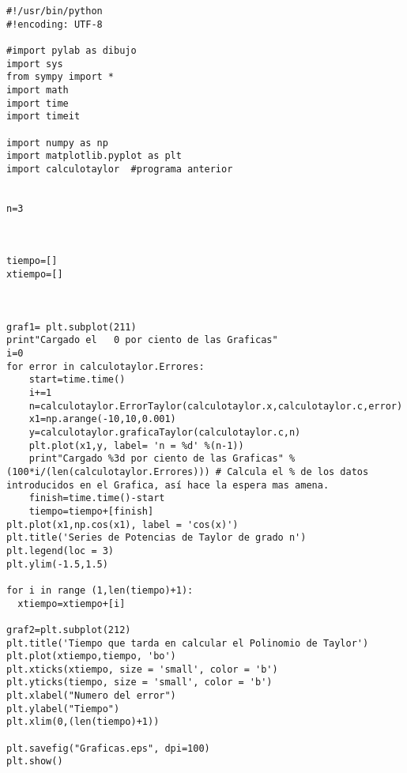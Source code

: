 \begin{center}
\begin{footnotesize}
\begin{verbatim}
#!/usr/bin/python
#!encoding: UTF-8

#import pylab as dibujo
import sys
from sympy import *
import math
import time
import timeit

import numpy as np 
import matplotlib.pyplot as plt
import calculotaylor  #programa anterior


n=3



tiempo=[]
xtiempo=[]



graf1= plt.subplot(211)
print"Cargado el   0 por ciento de las Graficas"
i=0
for error in calculotaylor.Errores:
    start=time.time()
    i+=1
    n=calculotaylor.ErrorTaylor(calculotaylor.x,calculotaylor.c,error)
    x1=np.arange(-10,10,0.001)
    y=calculotaylor.graficaTaylor(calculotaylor.c,n)
    plt.plot(x1,y, label= 'n = %d' %(n-1))
    print"Cargado %3d por ciento de las Graficas" %(100*i/(len(calculotaylor.Errores))) # Calcula el % de los datos introducidos en el Grafica, así hace la espera mas amena.
    finish=time.time()-start
    tiempo=tiempo+[finish]
plt.plot(x1,np.cos(x1), label = 'cos(x)')    
plt.title('Series de Potencias de Taylor de grado n')
plt.legend(loc = 3) 
plt.ylim(-1.5,1.5)

for i in range (1,len(tiempo)+1):
  xtiempo=xtiempo+[i]
  
graf2=plt.subplot(212)
plt.title('Tiempo que tarda en calcular el Polinomio de Taylor')
plt.plot(xtiempo,tiempo, 'bo')
plt.xticks(xtiempo, size = 'small', color = 'b')
plt.yticks(tiempo, size = 'small', color = 'b')
plt.xlabel("Numero del error")
plt.ylabel("Tiempo")
plt.xlim(0,(len(tiempo)+1))

plt.savefig("Graficas.eps", dpi=100)
plt.show()


\end{verbatim}
\end{footnotesize}
\end{center}
